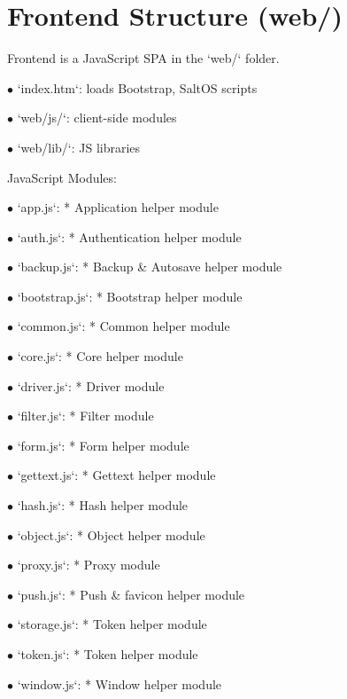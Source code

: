 \documentclass[a4paper]{article}
\begin{document}
\hypertarget{toc11}{}
\section{Frontend Structure (web/)}

Frontend is a JavaScript SPA in the `web/` folder.

\begin{compactitem}
\item[\color{myblue}$\bullet$] `index.htm`: loads Bootstrap, SaltOS scripts
\item[\color{myblue}$\bullet$] `web/js/`: client-side modules
\item[\color{myblue}$\bullet$] `web/lib/`: JS libraries
\end{compactitem}

JavaScript Modules:

\begin{compactitem}
\item[\color{myblue}$\bullet$] `app.js`: * Application helper module
\item[\color{myblue}$\bullet$] `auth.js`: * Authentication helper module
\item[\color{myblue}$\bullet$] `backup.js`: * Backup \& Autosave helper module
\item[\color{myblue}$\bullet$] `bootstrap.js`: * Bootstrap helper module
\item[\color{myblue}$\bullet$] `common.js`: * Common helper module
\item[\color{myblue}$\bullet$] `core.js`: * Core helper module
\item[\color{myblue}$\bullet$] `driver.js`: * Driver module
\item[\color{myblue}$\bullet$] `filter.js`: * Filter module
\item[\color{myblue}$\bullet$] `form.js`: * Form helper module
\item[\color{myblue}$\bullet$] `gettext.js`: * Gettext helper module
\item[\color{myblue}$\bullet$] `hash.js`: * Hash helper module
\item[\color{myblue}$\bullet$] `object.js`: * Object helper module
\item[\color{myblue}$\bullet$] `proxy.js`: * Proxy module
\item[\color{myblue}$\bullet$] `push.js`: * Push \& favicon helper module
\item[\color{myblue}$\bullet$] `storage.js`: * Token helper module
\item[\color{myblue}$\bullet$] `token.js`: * Token helper module
\item[\color{myblue}$\bullet$] `window.js`: * Window helper module
\end{compactitem}
\end{document}
